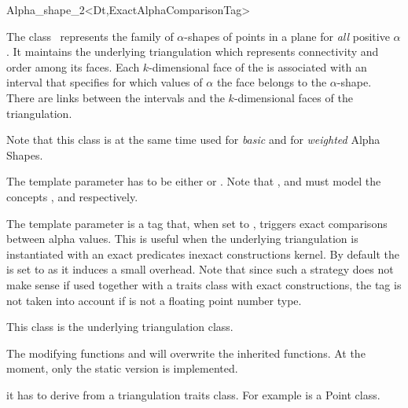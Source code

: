\begin{ccRefClass} {Alpha_shape_2<Dt,ExactAlphaComparisonTag>}

\ccDefinition

The class \ccClassTemplateName\ represents the family of
$\alpha$-shapes of points in a plane for {\em all} positive
$\alpha$. It maintains the underlying triangulation  which
represents connectivity and order among its faces. Each
$k$-dimensional face of the  is associated with
an interval that specifies for which values of $\alpha$ the face
belongs to the $\alpha$-shape. There are links between the intervals
and the $k$-dimensional faces of the triangulation.

Note that this class is at the same time used for {\em basic} and
for {\em weighted} Alpha Shapes.


\ccParameters

The template parameter  has to be either  or .
Note that ,  and  must model the concepts ,
 and  respectively.

The template parameter  is a tag that, when set to
, triggers exact comparisons between alpha values. This is useful
when the underlying triangulation is instantiated with an exact predicates inexact constructions
kernel. By default the  is set to  as it induces a small
overhead. Note that since such a strategy does not make sense if used together with a traits class with exact constructions,
the tag  is not taken into account if  is not a floating point number type.


\ccInheritsFrom


This class is the underlying triangulation class.

The modifying functions  and  will overwrite
the inherited functions. At the moment, only the static version is implemented.

\ccTypes
{}
\ccThreeToTwo

it has to derive from a  triangulation traits class.  
For example  is a Point class. 


\end{ccRefClass}
